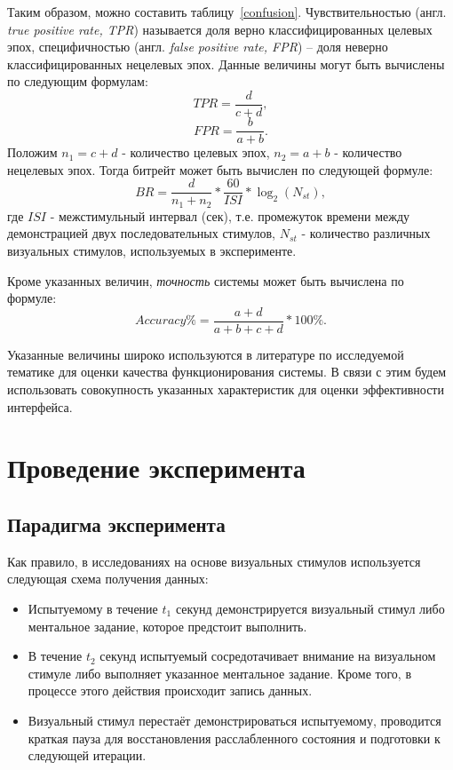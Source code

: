 \documentclass[12pt,fleqn]{article}
\begin{document}
	Таким образом, можно составить таблицу~\ref{confusion}. Чувствительностью (англ. {\it true positive rate, TPR}) называется доля верно классифицированных целевых эпох, специфичностью (англ. {\it false positive rate, FPR}) -- доля неверно классифицированных нецелевых эпох. Данные величины могут быть вычислены по следующим формулам:
$$TPR = \frac{d}{c+d},$$
$$FPR = \frac{b}{a+b}.$$
	Положим $n_1 = c+d$ - количество целевых эпох, $n_2 = a+b$ - количество нецелевых эпох. Тогда битрейт может быть вычислен по следующей формуле:
$$BR = \frac{d}{n_1 + n_2} * \frac{60}{ISI} * \log_2 (N_{st}),$$
где $ISI$ - межстимульный интервал (сек), т.е. промежуток времени между демонстрацией двух последовательных стимулов, $N_{st}$ - количество различных визуальных стимулов, используемых в эксперименте.
	\par Кроме указанных величин, {\it точность} системы может быть вычислена по формуле:
	$$Accuracy \% = \frac{a+d}{a+b+c+d} * 100 \%.$$
	\par Указанные величины широко используются в литературе по исследуемой тематике для оценки качества функционирования системы. В связи с этим будем использовать совокупность указанных характеристик для оценки эффективности интерфейса.
\newpage

\section{Проведение эксперимента}
\subsection{Парадигма эксперимента}
	\par Как правило, в исследованиях на основе визуальных стимулов используется следующая схема получения данных:
	\begin{itemize}
	\item
	Испытуемому в течение $t_1$ секунд демонстрируется визуальный стимул либо ментальное задание, которое предстоит выполнить. 
	\item
	В течение $t_2$ секунд испытуемый сосредотачивает внимание на визуальном стимуле либо выполняет указанное ментальное задание. Кроме того, в процессе этого действия происходит запись данных.
	\item
	Визуальный стимул перестаёт демонстрироваться испытуемому, проводится краткая пауза для восстановления расслабленного состояния и подготовки к следующей итерации.
	\end{itemize}
\end{document}
